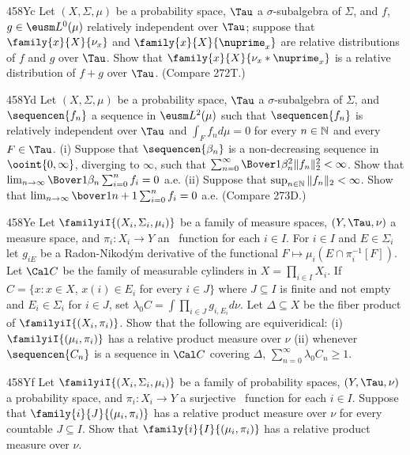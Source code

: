 {\spheader 458Yc Let $(X,\Sigma,\mu)$ be a probability space, $\Tau$ a
$\sigma$-subalgebra of $\Sigma$, and $f$, $g\in\eusm L^0(\mu)$
relatively independent over $\Tau$;  suppose that $\family{x}{X}{\nu_x}$
and $\family{x}{X}{\nuprime_x}$ are relative distributions of $f$ and
$g$ over $\Tau$.   Show that $\family{x}{X}{\nu_x*\nuprime_x}$ is a
relative distribution of $f+g$ over $\Tau$.   (Compare 272T.)

\spheader 458Yd Let $(X,\Sigma,\mu)$ be a probability space, $\Tau$ a
$\sigma$-subalgebra of $\Sigma$, and $\sequencen{f_n}$ a sequence in
$\eusm L^2(\mu)$ such that $\sequencen{f_n}$ is relatively independent
over $\Tau$ and $\int_Ff_nd\mu=0$ for every $n\in\Bbb N$ and every
$F\in\Tau$.   (i) Suppose that $\sequencen{\beta_n}$ is a non-decreasing
sequence in $\ooint{0,\infty}$, diverging to $\infty$, such that
$\sum_{n=0}^{\infty}\Bover1{\beta_n^2}\|f_n\|_2^2<\infty$.   Show that
$\lim_{n\to\infty}\Bover1{\beta_n}\sum_{i=0}^nf_i=0$ a.e.   (ii)
Suppose that $\sup_{n\in\Bbb N}\|f_n\|_2<\infty$.   Show that
$\lim_{n\to\infty}\bover1{n+1}\sum_{i=0}^nf_i=0$ a.e.   (Compare 273D.)

\spheader 458Ye Let $\familyiI{(X_i,\Sigma_i,\mu_i)}$ be a family of
measure spaces, $(Y,\Tau,\nu)$ a measure space, and $\pi_i:X_i\to Y$ an
\imp\ function for each $i\in I$.   For $i\in I$ and $E\in\Sigma_i$ let
$g_{iE}$ be a Radon-Nikod\'ym derivative of the functional
$F\mapsto\mu_i(E\cap\pi_i^{-1}[F])$.   Let $\Cal C$ be the family of
measurable cylinders in $X=\prod_{i\in I}X_i$.   If
$C=\{x:x\in X$, $x(i)\in E_i$ for every $i\in J\}$ where
$J\subseteq I$
is finite and not empty and $E_i\in\Sigma_i$ for $i\in J$, set
$\lambda_0C=\int\prod_{i\in J}g_{i,E_i}d\nu$.   Let $\Delta\subseteq X$
be the fiber product of $\familyiI{(X_i,\pi_i)}$.   Show that the
following are equiveridical:  (i) $\familyiI{(\mu_i,\pi_i)}$ has a
relative product measure over $\nu$ (ii) whenever
$\sequencen{C_n}$ is a sequence in $\Cal C$ covering $\Delta$,
$\sum_{n=0}^{\infty}\lambda_0C_n\ge 1$.

\spheader 458Yf Let $\familyiI{(X_i,\Sigma_i,\mu_i)}$ be a family of
probability spaces, $(Y,\Tau,\nu)$ a probability space, and
$\pi_i:X_i\to Y$ a
surjective \imp\ function for each $i\in I$.   Suppose that
$\family{i}{J}{(\mu_i,\pi_i)}$ has a relative product measure over $\nu$
for every countable $J\subseteq I$.   Show that
$\family{i}{I}{(\mu_i,\pi_i)}$ has a relative product measure over $\nu$.

}

